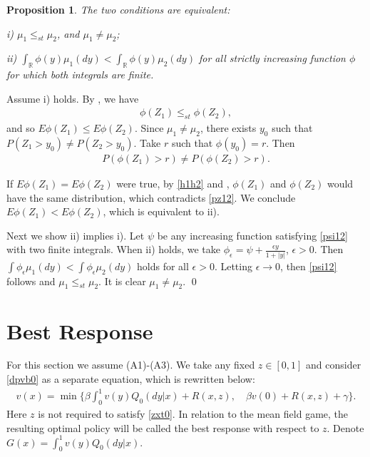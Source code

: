 \documentclass[graybox]{svmult}
\newtheorem{prop}{Proposition}
\begin{document}
\begin{prop}
The two conditions are equivalent:

i) $\mu_1\le_{st} \mu_2$, and $\mu_1\ne \mu_2$;

ii)  $\int_{\mathbb R} \phi(y)\mu_1(dy) <\int_{\mathbb R} \phi(y) \mu_2(dy)$ for all     strictly increasing function $\phi$ for which both integrals are finite.
\end{prop}

\proof Assume i) holds.  By \cite[Theorem 1.2.16]{MS02}, we have
\begin{align}
\phi(Z_1)\le_{st} \phi(Z_2), \label{h1h2}
\end{align}
and so $E\phi(Z_1)\le E\phi(Z_2)$.  Since $\mu_1\ne \mu_2$, there exists $y_0$ such that $P(Z_1> y_0)\ne P(Z_2>y_0)$. Take $r$ such that $\phi(y_0)=r$. Then \begin{align}
P(\phi(Z_1)>r)\ne P(\phi(Z_2)>r). \label{pz12}
\end{align}


 If  $E\phi(Z_1) =E\phi(Z_2)$ were true, by \eqref{h1h2}  and \cite[Theorem 1.2.9]{MS02},  $\phi(Z_1)$ and $\phi(Z_2)$  would have the same distribution, which contradicts
 \eqref{pz12}. We conclude $E\phi(Z_1)<E\phi(Z_2)$, which is equivalent to ii).

Next we show ii) implies i).  Let $\psi$ be any increasing function satisfying \eqref{psi12} with two finite integrals. When ii) holds, we take $\phi_\epsilon=  \psi +\frac{\epsilon y }{1+|y|}$, $\epsilon>0$. Then $\int \phi_\epsilon \mu_1(dy) < \int \phi_\epsilon \mu_2(dy)$ holds for all $\epsilon >0$.
  Letting $\epsilon \to 0$, then \eqref{psi12} follows and $\mu_1\le_{st} \mu_2$. It is clear $\mu_1\ne \mu_2$. \qed






\section{Best Response}
\label{sec:br}

For this section we assume (A1)-(A3).
 We take  any fixed $z\in [0,1]$ and consider \eqref{dpvb0} as a separate equation, which is rewritten below:
\begin{align}
v(x)= \min \Big\{
\beta\int_0^1 v (y)Q_0(dy|x) +R(x,z), \quad \beta v(0) +R(x, z)+\gamma
\Big\}. \label{dpb}
\end{align}
Here $z$  is not required to satisfy \eqref{zxt0}.
In relation to the mean field game, the resulting optimal policy will be called the
best response with respect to $z$.
Denote $G(x)= \int_0^1 v( y) Q_0(dy|x)$.
\end{document}
